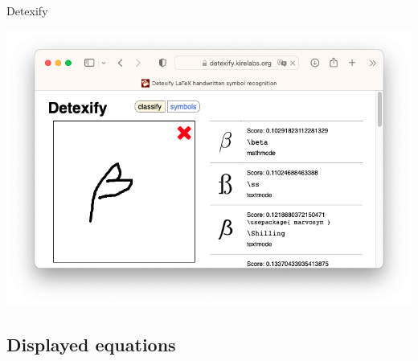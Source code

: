 \documentclass[,aspectratio=43]{beamer}
\begin{document}
\begin{frame}{Detexify}
\protect\hypertarget{detexify}{}
\centering
\vspace{-0.5em}

\href{https://detexify.kirelabs.org/classify.html}{\includegraphics{figure/detexify.png}}
\end{frame}

\hypertarget{displayed-equations}{%
\subsection{Displayed equations}\label{displayed-equations}}
\end{document}
